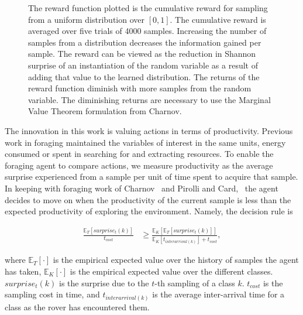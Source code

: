 
\begin{figure}%
	\centering
	\def\svgwidth{0.8\columnwidth}
	
	\caption{The reward function plotted is the cumulative reward for sampling from a uniform distribution over $\left[0,1\right]$.  The cumulative reward is averaged over five trials of 4000 samples.  Increasing the number of samples from a distribution decreases the information gained per sample.  The reward can be viewed as the reduction in Shannon surprise of an instantiation of the random variable as a result of adding that value to the learned distribution.  The returns of the reward function diminish with more samples from the random variable.  The diminishing returns are necessary to use the Marginal Value Theorem formulation from Charnov.~\cite{charnov1976optimal}}
	\label{fig:reward}
\end{figure}

The innovation in this work is valuing actions in terms of productivity.  Previous work in foraging maintained the variables of interest in the same units, energy consumed or spent in searching for and extracting resources.  To enable the foraging agent to compare actions, we measure productivity as the average surprise experienced from a sample per unit of time spent to acquire that sample.  In keeping with foraging work of Charnov~\cite{charnov1976optimal} and Pirolli and Card,~\cite{pirolli1999information} the agent decides to move on when the productivity of the current sample is less than the expected productivity of exploring the environment.  Namely, the decision rule is

\begin{align}
\label{eq:decision_rule}
	\frac{\mathbb{E}_{T}\left[surprise_{t}\left(k\right)\right]}{t_{cost}} &\geq \frac{\mathbb{E}_{K}\left[\mathbb{E}_{T}\left[surprise_{t}\left(k\right)\right]\right]}{\mathbb{E}_{K}\left[t_{interarrival(k)}\right] + t_{cost}},
\end{align}

where $\mathbb{E}_{T}\left[\cdot\right]$ is the empirical expected value over the history of samples the agent has taken, $\mathbb{E}_{K}\left[\cdot\right]$ is the empirical expected value over the different classes. $surprise_{t}(k)$ is the surprise due to the $t$-th sampling of a class $k$.  $t_{cost}$ is the sampling cost in time, and $t_{interarrival(k)}$ is the average inter-arrival time for a class as the rover has encountered them.



